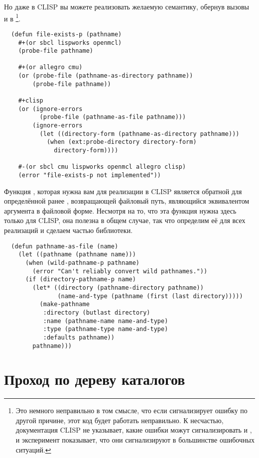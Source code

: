 Но даже в CLISP вы можете реализовать желаемую семантику, обернув вызовы 
и  в \footnote{Это немного неправильно в том
  смысле, что если  сигнализирует ошибку по другой причине, этот код
  будет работать неправильно. К несчастью, документация CLISP не указывает, какие ошибки
  можут сигнализировать  и , и эксперимент
  показывает, что они сигнализируют  в большинстве ошибочных
  ситуаций.}.

\begin{lstlisting}
  (defun file-exists-p (pathname)
    #+(or sbcl lispworks openmcl)
    (probe-file pathname)

    #+(or allegro cmu)
    (or (probe-file (pathname-as-directory pathname))
        (probe-file pathname))

    #+clisp
    (or (ignore-errors
          (probe-file (pathname-as-file pathname)))
        (ignore-errors
          (let ((directory-form (pathname-as-directory pathname)))
            (when (ext:probe-directory directory-form)
              directory-form))))

    #-(or sbcl cmu lispworks openmcl allegro clisp)
    (error "file-exists-p not implemented"))
\end{lstlisting}

Функция , которая нужна вам для реализации  в
CLISP является обратной для определённой ранее , возвращающей
файловый путь, являющийся эквивалентом аргумента в файловой форме. Несмотря на то, что эта
функция нужна здесь только для CLISP, она полезна в общем случае, так что определим её для
всех реализаций и сделаем частью библиотеки.

\begin{lstlisting}
  (defun pathname-as-file (name)
    (let ((pathname (pathname name)))
      (when (wild-pathname-p pathname)
        (error "Can't reliably convert wild pathnames."))
      (if (directory-pathname-p name)
        (let* ((directory (pathname-directory pathname))
               (name-and-type (pathname (first (last directory)))))
          (make-pathname
           :directory (butlast directory)
           :name (pathname-name name-and-type)
           :type (pathname-type name-and-type)
           :defaults pathname))
        pathname)))
\end{lstlisting}

\section{Проход по дереву каталогов}

